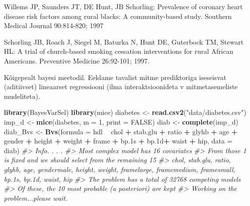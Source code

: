 \documentclass[]{book}
\newenvironment{Shaded}{\begin{snugshade}}{\end{snugshade}}
\newcommand{\CommentTok}[1]{\textcolor[rgb]{0.56,0.35,0.01}{\textit{#1}}}
\newcommand{\DataTypeTok}[1]{\textcolor[rgb]{0.13,0.29,0.53}{#1}}
\newcommand{\DecValTok}[1]{\textcolor[rgb]{0.00,0.00,0.81}{#1}}
\newcommand{\FloatTok}[1]{\textcolor[rgb]{0.00,0.00,0.81}{#1}}
\newcommand{\KeywordTok}[1]{\textcolor[rgb]{0.13,0.29,0.53}{\textbf{#1}}}
\newcommand{\NormalTok}[1]{#1}
\newcommand{\OperatorTok}[1]{\textcolor[rgb]{0.81,0.36,0.00}{\textbf{#1}}}
\newcommand{\OtherTok}[1]{\textcolor[rgb]{0.56,0.35,0.01}{#1}}
\newcommand{\StringTok}[1]{\textcolor[rgb]{0.31,0.60,0.02}{#1}}
\begin{document}
Willems JP, Saunders JT, DE Hunt, JB Schorling: Prevalence of coronary heart disease risk factors among rural blacks: A community-based study. Southern Medical Journal 90:814-820; 1997

Schorling JB, Roach J, Siegel M, Baturka N, Hunt DE, Guterbock TM, Stewart HL: A trial of church-based smoking cessation interventions for rural African Americans. Preventive Medicine 26:92-101; 1997.

Kõigepealt bayesi meetodil. Eeldame tavalist mitme prediktoriga iseseisvat (aditiivset) lineaarset regressiooni (ilma interaktsioonideta v mitmetasemeliste mudeliteta).

\begin{Shaded}
\begin{Highlighting}[]
\KeywordTok{library}\NormalTok{(BayesVarSel)}
\KeywordTok{library}\NormalTok{(mice)}
\NormalTok{diabetes <-}\StringTok{ }\KeywordTok{read.csv2}\NormalTok{(}\StringTok{"data/diabetes.csv"}\NormalTok{)}
\NormalTok{imp_d <-}\StringTok{ }\KeywordTok{mice}\NormalTok{(diabetes, }\DataTypeTok{m =} \DecValTok{1}\NormalTok{, }\DataTypeTok{print =} \OtherTok{FALSE}\NormalTok{)}
\NormalTok{diab <-}\StringTok{ }\KeywordTok{complete}\NormalTok{(imp_d) }
\NormalTok{diab_Bvs <-}\StringTok{ }\KeywordTok{Bvs}\NormalTok{(}\DataTypeTok{formula =}\NormalTok{ hdl }\OperatorTok{~}\StringTok{ }\NormalTok{chol }\OperatorTok{+}\StringTok{ }\NormalTok{stab.glu }\OperatorTok{+}\StringTok{ }\NormalTok{ratio }\OperatorTok{+}\StringTok{ }\NormalTok{glyhb }\OperatorTok{+}\StringTok{ }\NormalTok{age }\OperatorTok{+}\StringTok{ }\NormalTok{gender }\OperatorTok{+}\StringTok{ }\NormalTok{height }\OperatorTok{+}\StringTok{ }\NormalTok{weight }\OperatorTok{+}\StringTok{ }\NormalTok{frame }\OperatorTok{+}\StringTok{ }\NormalTok{bp}\FloatTok{.1}\NormalTok{s }\OperatorTok{+}\StringTok{ }\NormalTok{bp}\FloatTok{.1}\NormalTok{d}\OperatorTok{+}\StringTok{ }\NormalTok{waist }\OperatorTok{+}\StringTok{ }\NormalTok{hip, }\DataTypeTok{data =}\NormalTok{ diab)}
\CommentTok{#> Info. . . .}
\CommentTok{#> Most complex model has 16 covariates}
\CommentTok{#> From those 1 is fixed and we should select from the remaining 15 }
\CommentTok{#> chol, stab.glu, ratio, glyhb, age, gendermale, height, weight, framelarge, framemedium, framesmall, bp.1s, bp.1d, waist, hip}
\CommentTok{#> The problem has a total of 32768 competing models}
\CommentTok{#> Of these, the  10 most probable (a posteriori) are kept}
\CommentTok{#> Working on the problem...please wait.}
\end{Highlighting}
\end{Shaded}
\end{document}
